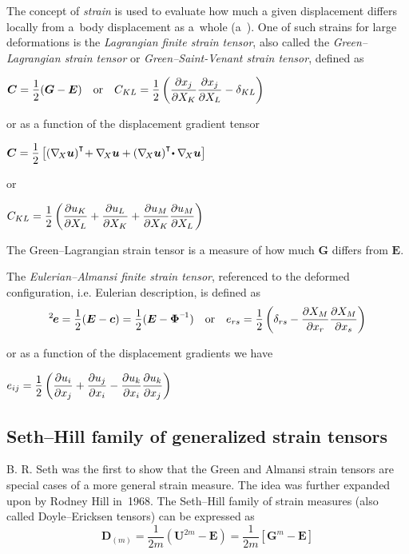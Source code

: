 \begin{otherlanguage}{russian}
{The concept of \emph{strain} is used to evaluate how much a given displacement differs locally from a~body displacement as a~whole (a~). One of such strains for large deformations is the \emph{Lagrangian finite strain tensor}, also called the \emph{Green\hbox{--}Lagrangian strain tensor} or \emph{Green\hbox{--}Saint\hbox{-}Venant strain tensor}, defined as

${\displaystyle \bm{C} = \onehalf (\bm{G} - \bm{E})
\quad {\text{or}} \quad
C_{KL} = \onehalf \left( {\frac{\partial x_{j}}{\partial X_{K}}}{\frac{\partial x_{j}}{\partial X_{L}}} - \delta_{KL} \right)}$

or as a function of the displacement gradient tensor

${\displaystyle \bm{C} = \onehalf \left[(\nabla_{\!X}\bm{u})^{\T}\! + \nabla_{\!X}\bm{u} + (\nabla_{\!X}\bm{u})^{\T}\! \dotp \nabla_{\!X}\bm{u} \right]}$

or

${\displaystyle C_{KL} = \onehalf \left({\frac{\partial u_{K}}{\partial X_{L}}} + {\frac{\partial u_{L}}{\partial X_{K}}} + {\frac{\partial u_{M}}{\partial X_{K}}}{\frac{\partial u_{M}}{\partial X_{L}}}\right)}$

The Green\hbox{--}Lagrangian strain tensor is a measure of how much $\bm{G}$ differs from $\bm{E}$.

The \emph{Eulerian\hbox{--}Almansi finite strain tensor}, referenced to the deformed configuration, i.e. Eulerian description, is defined as
\[ \displaystyle ^2\hspace{-0.2ex}\bm{e} = \onehalf (\bm{E} - \bm{c}) = \onehalf (\bm{E} - \bm{\Phi}^{\expminusone})
\quad {\text{or}} \quad
e_{rs} = \onehalf \left( \delta _{rs} - {\frac{\partial X_{M}}{\partial x_{r}}}{\frac{\partial X_{M}}{\partial x_{s}}} \right) \]

or as a function of the displacement gradients we have

${\displaystyle e_{ij} = \onehalf \left( {\frac{\partial u_{i}}{\partial x_{j}}} + {\frac{\partial u_{j}}{\partial x_{i}}} - {\frac{\partial u_{k}}{\partial x_{i}}}{\frac{\partial u_{k}}{\partial x_{j}}} \right)}$

\subsection*{Seth\hbox{--}Hill family of generalized strain tensors}

B. R. Seth was the first to show that the Green and Almansi strain tensors are special cases of a more general strain measure. The idea was further expanded upon by Rodney Hill in~1968. The Seth\hbox{--}Hill family of strain measures (also called Doyle\hbox{--}Ericksen tensors) can be expressed as
\[ \displaystyle \bm{D}_{(m)} = \frac{1}{2m} (\bm{U}^{2m} \! - \bm{E}) = \frac{1}{2m} \left[\bm{G}^{m} \! - \bm{E} \right] \]

}
\end{otherlanguage}
